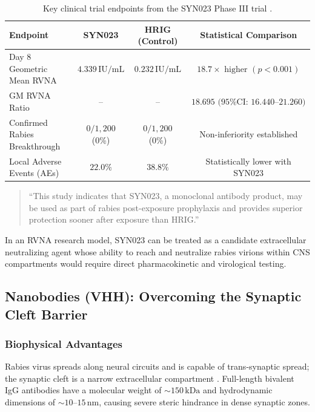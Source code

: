 \documentclass[12pt,a4paper]{article}
\begin{document}
\begin{table}[htbp]
\centering
\small
\begin{tabular}{@{}lccc@{}}
\toprule
\textbf{Endpoint} & \textbf{SYN023} & \textbf{HRIG (Control)} & \textbf{Statistical Comparison} \\
\midrule
Day 8 Geometric Mean RVNA & $4.339\,\mathrm{IU/mL}$ & $0.232\,\mathrm{IU/mL}$ & $18.7\times\text{ higher } (p < 0.001)$ \\
GM RVNA Ratio & -- & -- & $18.695\text{ (95\% CI: } 16.440\text{--}21.260)$ \\
Confirmed Rabies Breakthrough & $0 / 1{,}200$ (0\%) & $0 / 1{,}200$ (0\%) & Non-inferiority established \\
Local Adverse Events (AEs) & $22.0\%$ & $38.8\%$ & Statistically lower with SYN023 \\
\bottomrule
\end{tabular}
\caption{Key clinical trial endpoints from the SYN023 Phase III trial \citep{liu2025syn023}.}\label{tab:syn023}
\end{table}

\begin{quote}
``This study indicates that SYN023, a monoclonal antibody product, may be used as part of rabies post-exposure prophylaxis and provides superior protection sooner after exposure than HRIG.'' \citep{liu2025syn023}
\end{quote}

In an RVNA research model, SYN023 can be treated as a candidate extracellular neutralizing agent whose ability to reach and neutralize rabies virions within CNS compartments would require direct pharmacokinetic and virological testing.

\subsection{Nanobodies (VHH): Overcoming the Synaptic Cleft Barrier}

\subsubsection{Biophysical Advantages}

Rabies virus spreads along neural circuits and is capable of trans-synaptic spread; the synaptic cleft is a narrow extracellular compartment \citep{terryn2016vhh}. Full-length bivalent IgG antibodies have a molecular weight of $\sim 150\,\mathrm{kDa}$ and hydrodynamic dimensions of $\sim 10\text{--}15\,\mathrm{nm}$, causing severe steric hindrance in dense synaptic zones.
\end{document}
